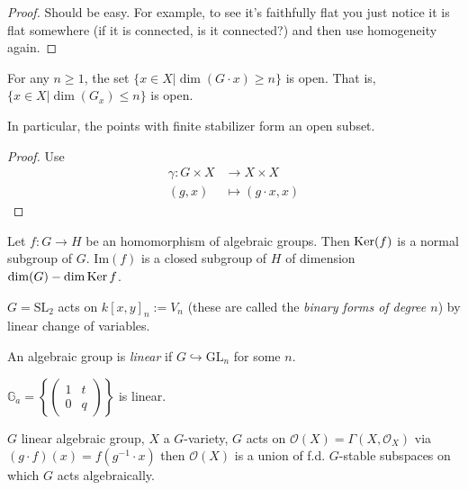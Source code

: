 \begin{proof}
Should be easy.
For example, to see it's faithfully flat you just notice it is flat somewhere
(if it is connected, is it connected?) and then use homogeneity again.
\end{proof}

\begin{proposition}
\label{proposition-bound-on-dimension-of-orbit-gives-open-set}
For any $n \geq 1$, the set $\{x \in X|\dim(G\cdot x)\geq n\}$ is open. That is,
$\{x \in X|\dim(G_x)\leq n\}$ is open.

In particular, the points with finite stabilizer form an open subset.
\end{proposition}

\begin{proof}
Use
\begin{align*}
\gamma: G \times X &\longrightarrow X\times X \\
(g,x) &\longmapsto (g\cdot x,x)
\end{align*}
\end{proof}

\begin{lemma}
\label{lemma-homomorphism-of-algebraic-groups}
Let $f:G \to H$ be an homomorphism of algebraic groups. Then $\mathop{\mathrm{Ker}} (f)$ is a
normal subgroup of $G$. $\text{Im}(f)$ is a
closed subgroup of $H$ of dimension $\dim(G)-\dim \mathop{\mathrm{Ker}} f$.
\end{lemma}

\begin{example}
\label{example-SL2-acts-on-homogeneous-polynomials}
$G=\text{SL}_2$ acts on $k[x,y]_n:=V_n$ (these are called the {\it binary forms 
of degree $n$}) by linear change of variables.
\end{example}

\begin{definition}
\label{definition-linear-algebraic-group}
An algebraic group is {\it linear} if $G \hookrightarrow \text{GL}_n$ for some
$n$.
\end{definition}

\begin{example}
\label{example-multiplicative-group-is-linear}
$\mathbb{G}_a=\left\{\begin{pmatrix}
1&t\\ 
0&q
\end{pmatrix}\right\}$ is linear.
\end{example}

\begin{proposition}
\label{proposition-co-action}
$G$ linear algebraic group,  $X$ a $G$-variety, $G$ acts on
$\mathcal{O}(X)=\Gamma(X,\mathcal{O}_X)$ via $(g\cdot f)(x)=f(g^{-1}\cdot x)$
then $\mathcal{O}(X)$ is a union of f.d. $G$-stable subspaces on which $G$ acts
algebraically.
\end{proposition}

